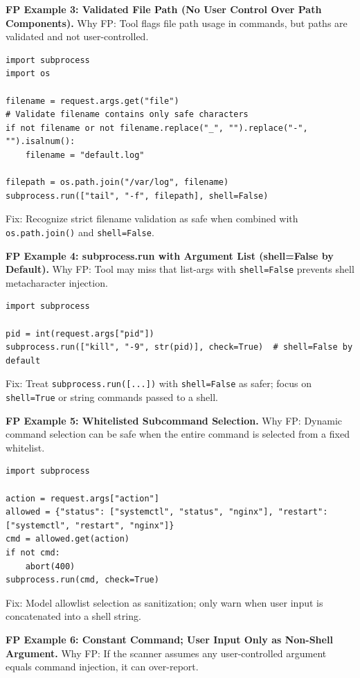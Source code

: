 \textbf{FP Example 3: Validated File Path (No User Control Over Path Components).} Why FP: Tool flags file path usage in commands, but paths are validated and not user-controlled.

\begin{lstlisting}[style=pycode]
import subprocess
import os

filename = request.args.get("file")
# Validate filename contains only safe characters
if not filename or not filename.replace("_", "").replace("-", "").isalnum():
    filename = "default.log"

filepath = os.path.join("/var/log", filename)
subprocess.run(["tail", "-f", filepath], shell=False)
\end{lstlisting}
Fix: Recognize strict filename validation as safe when combined with \texttt{os.path.join()} and \texttt{shell=False}.

\textbf{FP Example 4: subprocess.run with Argument List (shell=False by Default).} Why FP: Tool may miss that list-args with \texttt{shell=False} prevents shell metacharacter injection.

\begin{lstlisting}[style=pycode]
import subprocess

pid = int(request.args["pid"])
subprocess.run(["kill", "-9", str(pid)], check=True)  # shell=False by default
\end{lstlisting}
Fix: Treat \texttt{subprocess.run([...])} with \texttt{shell=False} as safer; focus on \texttt{shell=True} or string commands passed to a shell.

\textbf{FP Example 5: Whitelisted Subcommand Selection.} Why FP: Dynamic command selection can be safe when the entire command is selected from a fixed whitelist.

\begin{lstlisting}[style=pycode]
import subprocess

action = request.args["action"]
allowed = {"status": ["systemctl", "status", "nginx"], "restart": ["systemctl", "restart", "nginx"]}
cmd = allowed.get(action)
if not cmd:
    abort(400)
subprocess.run(cmd, check=True)
\end{lstlisting}
Fix: Model allowlist selection as sanitization; only warn when user input is concatenated into a shell string.

\textbf{FP Example 6: Constant Command; User Input Only as Non-Shell Argument.} Why FP: If the scanner assumes any user-controlled argument equals command injection, it can over-report.

